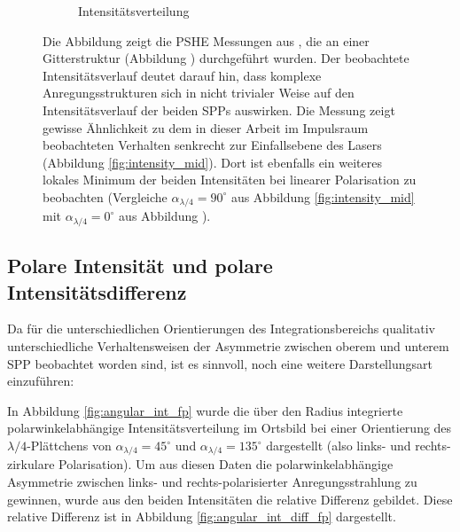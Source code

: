 \documentclass[a4paper, titlepage,  ngerman]{book}
\begin{document}
\begin{figure}
\begin{subfigure}{0.49\textwidth}
			\caption{Intensitätsverteilung}
			\label{fig:RF_measure_int}
		\end{subfigure}
		\caption[Vergleichsmessung aus \cite{RodriguezFortuno.2013}]{Die Abbildung  zeigt die PSHE Messungen aus \cite{RodriguezFortuno.2013}, die an einer Gitterstruktur (Abbildung ) durchgeführt wurden. Der beobachtete Intensitätsverlauf deutet darauf hin, dass komplexe Anregungsstrukturen sich in nicht trivialer Weise auf den Intensitätsverlauf der beiden SPPs auswirken. Die Messung zeigt gewisse Ähnlichkeit zu dem in dieser Arbeit im Impulsraum beobachteten Verhalten senkrecht zur Einfallsebene des Lasers (Abbildung \ref{fig:intensity_mid}). Dort ist ebenfalls ein weiteres lokales Minimum der beiden Intensitäten bei linearer Polarisation zu beobachten (Vergleiche $\alpha_{\lambda/4}= 90^\circ$ aus Abbildung \ref{fig:intensity_mid} mit $\alpha_{\lambda/4}= 0^\circ$ aus Abbildung ).}
		\label{fig:RF_measure}		
	\end{figure}
	\FloatBarrier
	\subsection{Polare Intensität und polare Intensitätsdifferenz}
		\label{sec:polar_int}	
		Da für die unterschiedlichen Orientierungen des Integrationsbereichs qualitativ unterschiedliche Verhaltensweisen der Asymmetrie zwischen oberem und unterem SPP beobachtet worden sind, ist es sinnvoll, noch eine weitere Darstellungsart einzuführen:		
		
		 In Abbildung \ref{fig:angular_int_fp} wurde die über den Radius integrierte polarwinkelabhängige Intensitätsverteilung im Ortsbild bei einer Orientierung des $\lambda / 4$-Plättchens von $\alpha_{\lambda/4} = 45^\circ$ und  $\alpha_{\lambda/4} = 135^\circ$ dargestellt (also links- und rechts-zirkulare Polarisation). Um aus diesen Daten die polarwinkelabhängige Asymmetrie zwischen links- und rechts-polarisierter Anregungsstrahlung zu gewinnen, wurde aus den beiden Intensitäten die relative Differenz gebildet. Diese relative Differenz ist in Abbildung \ref{fig:angular_int_diff_fp} dargestellt.
\end{document}
